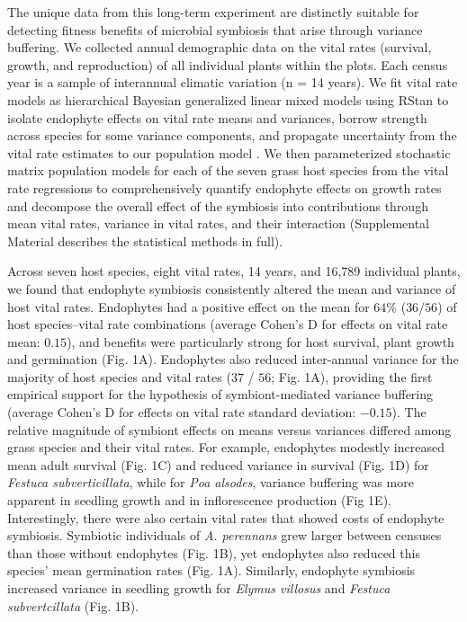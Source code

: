 \documentclass[12pt]{article}
\begin{document}
The unique data from this long-term experiment are distinctly suitable for detecting fitness benefits of microbial symbiosis that arise through variance buffering. 
We collected annual demographic data on the vital rates (survival, growth, and reproduction) of all individual plants within the plots. 
Each census year is a sample of interannual climatic variation (n = 14 years).
We fit vital rate models as hierarchical Bayesian generalized linear mixed models using RStan \cite{rstan2022} to isolate endophyte effects on vital rate means and variances, borrow strength across species for some variance components, and propagate uncertainty from the vital rate estimates to our population model \cite{elderd2016quantifying}. 
We then parameterized stochastic matrix population models for each of the seven grass host species from the vital rate regressions to comprehensively quantify endophyte effects on growth rates and decompose the overall effect of the symbiosis into contributions through mean vital rates, variance in vital rates, and their interaction (Supplemental Material describes the statistical methods in full).

Across seven host species, eight vital rates, 14 years, and 16,789 individual plants, we found that endophyte symbiosis consistently altered the mean and variance of host vital rates. 
Endophytes had a positive effect on the mean for $64$\% ($36$/$56$) of host species--vital rate combinations (average Cohen's D for effects on vital rate mean: $0.15$), and benefits were particularly strong for host survival, plant growth and germination (Fig. 1A).
Endophytes also reduced inter-annual variance for the majority of host species and vital rates ($37$ / $56$; Fig. 1A), providing the first empirical support for the hypothesis of symbiont-mediated variance buffering (average Cohen's D for effects on vital rate standard deviation: $-0.15$).
The relative magnitude of symbiont effects on means versus variances differed among grass species and their vital rates.
For example, endophytes modestly increased mean adult survival (Fig. 1C) and reduced variance in survival (Fig. 1D) for \emph{Festuca subverticillata}, while for \emph{Poa alsodes}, variance buffering was more apparent in seedling growth and in inflorescence production (Fig 1E). 
Interestingly, there were also certain vital rates that showed costs of endophyte symbiosis. 
Symbiotic individuals of \emph{A. perennans} grew larger between censuses than those without endophytes (Fig. 1B), yet endophytes also reduced this species' mean germination rates (Fig. 1A). 
Similarly, endophyte symbiosis increased variance in seedling growth for \emph{Elymus villosus} and \emph{Festuca subvertcillata} (Fig. 1B).
 
\end{document}
